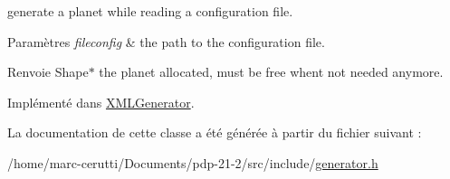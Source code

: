 generate a planet while reading a configuration file. 


\begin{DoxyParams}{Paramètres}
{\em fileconfig} & the path to the configuration file. \\
\hline
\end{DoxyParams}
\begin{DoxyReturn}{Renvoie}
Shape$\ast$ the planet allocated, must be free whent not needed anymore. 
\end{DoxyReturn}


Implémenté dans \hyperlink{class_x_m_l_generator_adf874b492da2e813980151c3453dd75c}{X\+M\+L\+Generator}.



La documentation de cette classe a été générée à partir du fichier suivant \+:\begin{DoxyCompactItemize}
\item 
/home/marc-\/cerutti/\+Documents/pdp-\/21-\/2/src/include/\hyperlink{generator_8h}{generator.\+h}\end{DoxyCompactItemize}
